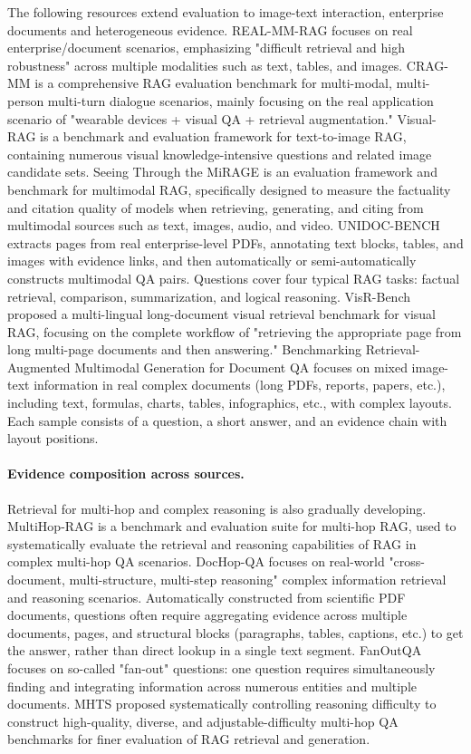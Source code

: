 The following resources extend evaluation to image-text interaction, enterprise documents and heterogeneous evidence. REAL-MM-RAG \cite{realmmrag2025} focuses on real enterprise/document scenarios, emphasizing "difficult retrieval and high robustness" across multiple modalities such as text, tables, and images. CRAG-MM \cite{cragmm2024} is a comprehensive RAG evaluation benchmark for multi-modal, multi-person multi-turn dialogue scenarios, mainly focusing on the real application scenario of "wearable devices + visual QA + retrieval augmentation." Visual-RAG \cite{visualrag2025} is a benchmark and evaluation framework for text-to-image RAG, containing numerous visual knowledge-intensive questions and related image candidate sets. Seeing Through the MiRAGE \cite{mirage2025} is an evaluation framework and benchmark for multimodal RAG, specifically designed to measure the factuality and citation quality of models when retrieving, generating, and citing from multimodal sources such as text, images, audio, and video. UNIDOC-BENCH \cite{unidocbench2025} extracts pages from real enterprise-level PDFs, annotating text blocks, tables, and images with evidence links, and then automatically or semi-automatically constructs multimodal QA pairs. Questions cover four typical RAG tasks: factual retrieval, comparison, summarization, and logical reasoning. VisR-Bench \cite{visrbench2025} proposed a multi-lingual long-document visual retrieval benchmark for visual RAG, focusing on the complete workflow of "retrieving the appropriate page from long multi-page documents and then answering." Benchmarking Retrieval-Augmented Multimodal Generation for Document QA \cite{benchmarkmmrag2025} focuses on mixed image-text information in real complex documents (long PDFs, reports, papers, etc.), including text, formulas, charts, tables, infographics, etc., with complex layouts. Each sample consists of a question, a short answer, and an evidence chain with layout positions.

\paragraph{Evidence composition across sources.}
Retrieval for multi-hop and complex reasoning is also gradually developing. MultiHop-RAG \cite{multihoprag2024} is a benchmark and evaluation suite for multi-hop RAG, used to systematically evaluate the retrieval and reasoning capabilities of RAG in complex multi-hop QA scenarios. DocHop-QA \cite{dochopqa2025} focuses on real-world "cross-document, multi-structure, multi-step reasoning" complex information retrieval and reasoning scenarios. Automatically constructed from scientific PDF documents, questions often require aggregating evidence across multiple documents, pages, and structural blocks (paragraphs, tables, captions, etc.) to get the answer, rather than direct lookup in a single text segment. FanOutQA \cite{fanoutqa2024} focuses on so-called "fan-out" questions: one question requires simultaneously finding and integrating information across numerous entities and multiple documents. MHTS \cite{mhts2025} proposed systematically controlling reasoning difficulty to construct high-quality, diverse, and adjustable-difficulty multi-hop QA benchmarks for finer evaluation of RAG retrieval and generation.

